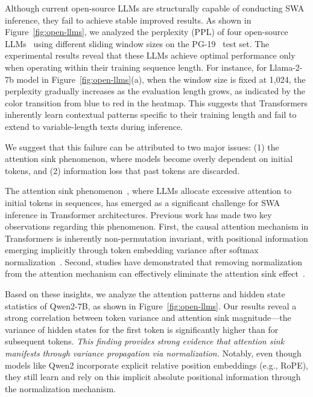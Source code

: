 Although current open-source LLMs are structurally capable of conducting SWA inference, they fail to achieve stable improved results. As shown in Figure~\ref{fig:open-llms}, we analyzed the perplexity (PPL) of four open-source LLMs~\cite{llama2,llama3,mistral-7b,qwen2} using different sliding window sizes on the PG-19~\cite{pg19} test set. The experimental results reveal that these LLMs achieve optimal performance only when operating within their training sequence length. For instance, for Llama-2-7b model in Figure~\ref{fig:open-llms}(a), when the window size is fixed at 1,024, the perplexity gradually increases as the evaluation length grows, as indicated by the color transition from blue to red in the heatmap.
This suggests that Transformers inherently learn contextual patterns specific to their training length and fail to extend to variable-length texts during inference.

We suggest that this failure can be attributed to two major issues:
(1) the attention sink phenomenon, where models become overly dependent on initial tokens, 
and (2) information loss that past tokens are discarded.

The attention sink phenomenon~\cite{streamingllm}, where LLMs allocate excessive attention to initial tokens in sequences, has emerged as a significant challenge for SWA inference in Transformer architectures. Previous work has made two key observations regarding this phenomenon. First, the causal attention mechanism in Transformers is inherently non-permutation invariant, with positional information emerging implicitly through token embedding variance after softmax normalization~\cite{variance}. Second, studies have demonstrated that removing normalization from the attention mechanism can effectively eliminate the attention sink effect~\cite{whensinkemerge}.



Based on these insights, we analyze the attention patterns and hidden state statistics of Qwen2-7B, as shown in Figure~\ref{fig:open-llms}. Our results reveal a strong correlation between token variance and attention sink magnitude---the variance of hidden states for the first token is significantly higher than for subsequent tokens. \textit{This finding provides strong evidence that attention sink manifests through variance propagation via normalization.} Notably, even though models like Qwen2 incorporate explicit relative position embeddings (e.g., RoPE), they still learn and rely on this implicit absolute positional information through the normalization mechanism.

